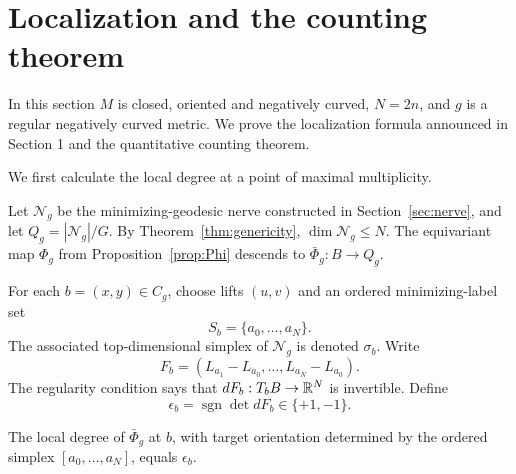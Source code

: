 \section{Localization and the counting theorem}
\label{sec:localization}

In this section $M$ is closed, oriented and negatively curved,
$N=2n$, and $g$ is a regular negatively curved metric.
We prove the localization formula announced in
Section 1 and the quantitative counting theorem.

We first calculate the local degree at a point of maximal multiplicity.

Let $\mathcal N_g$ be the minimizing-geodesic nerve
constructed in Section~\ref{sec:nerve}, and let
$Q_g=|\mathcal N_g|/G$.
By Theorem~\ref{thm:genericity}, $\dim\mathcal N_g\leq N$.
The equivariant map $\Phi_g$ from
Proposition~\ref{prop:Phi} descends to
$\bar\Phi_g:B\to Q_g$.

For each $b=(x,y)\in C_g$, choose lifts
$(u,v)$ and an ordered minimizing-label set
\[
 S_b=\{a_0,\ldots,a_N\}.
\]
The associated top-dimensional simplex of
$\mathcal N_g$ is denoted $\sigma_b$.
Write
\[
 F_b=(L_{a_1}-L_{a_0},\ldots,L_{a_N}-L_{a_0}).
\]
The regularity condition says that
$dF_b:T_bB\to\mathbb{R}^N$ is invertible.
Define
\begin{equation}\label{eq:local-sign}
 \epsilon_b=\operatorname{sgn}\det dF_b\in\{+1,-1\}.
\end{equation}

\begin{lemma}\label{lem:local-degree}
The local degree of $\bar\Phi_g$ at $b$,
with target orientation determined by the
ordered simplex $[a_0,\ldots,a_N]$, equals
$\epsilon_b$.
\end{lemma}

